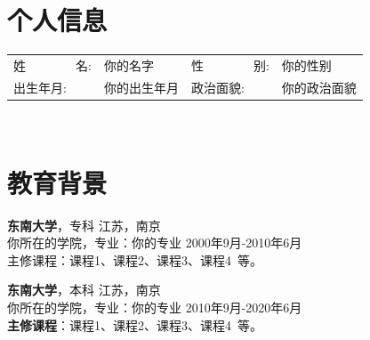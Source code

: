 \documentclass[11pt]{article}
\begin{document}
    \begin{minipage}[b]{\textwidth} %
    \begin{minipage}[t]{0.78\textwidth}
        \section{\makebox[\widthof{\faAddressCard}][c]{\color{primary_color}{\faAddressCard}}\quad 个人信息}
        \begin{tabularx}{\linewidth}{p{}Xp{}X}
            姓\ \ \ \ \ \ \ \ 名: & 你的名字 & 
            性\ \ \ \ \ \ \ \ 别: & 你的性别 \\
            出生年月: & 你的出生年月 & 
            政治面貌: & 你的政治面貌 \\
        \end{tabularx} \ %

        \section{\makebox[\widthof{\faGraduationCap}][c]{\color{primary_color}{\faGraduationCap}}\quad 教育背景}
        
        {\large \textbf{东南大学}}，专科 \hfill {江苏，南京} \\
        {{你所在的学院}}，专业：你的专业 \hfill {2000年9月-2010年6月} \\
        {主修课程}：课程1、课程2、课程3、课程4\ 等。
        
        \vspace{0.5em}
        {\large \textbf{东南大学}}，本科 \hfill {江苏，南京} \\
        {{你所在的学院}}，专业：你的专业 \hfill {2010年9月-2020年6月} \\
        \textbf{主修课程}：课程1、课程2、课程3、课程4\ 等。
        

\end{minipage}
\end{minipage}
\end{document}
